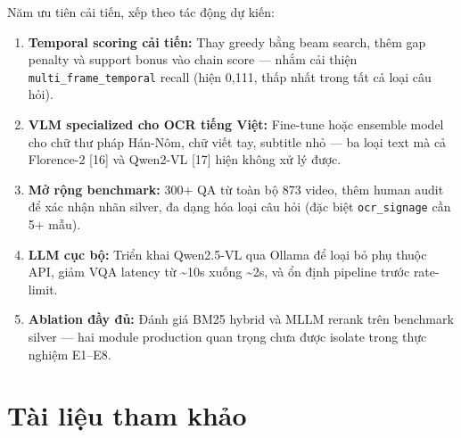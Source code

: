 \documentclass[12pt,a4paper,onecolumn]{article}
\begin{document}
Năm ưu tiên cải tiến, xếp theo tác động dự kiến:

\begin{enumerate}
  \item \textbf{Temporal scoring cải tiến:} Thay greedy bằng beam search, thêm gap penalty và support bonus vào chain score — nhắm cải thiện \texttt{multi\_frame\_temporal} recall (hiện 0,111, thấp nhất trong tất cả loại câu hỏi).
  \item \textbf{VLM specialized cho OCR tiếng Việt:} Fine-tune hoặc ensemble model cho chữ thư pháp Hán-Nôm, chữ viết tay, subtitle nhỏ — ba loại text mà cả Florence-2 [16] và Qwen2-VL [17] hiện không xử lý được.
  \item \textbf{Mở rộng benchmark:} 300+ QA từ toàn bộ 873 video, thêm human audit để xác nhận nhãn silver, đa dạng hóa loại câu hỏi (đặc biệt \texttt{ocr\_signage} cần 5+ mẫu).
  \item \textbf{LLM cục bộ:} Triển khai Qwen2.5-VL qua Ollama để loại bỏ phụ thuộc API, giảm VQA latency từ \textasciitilde{}10s xuống \textasciitilde{}2s, và ổn định pipeline trước rate-limit.
  \item \textbf{Ablation đầy đủ:} Đánh giá BM25 hybrid và MLLM rerank trên benchmark silver — hai module production quan trọng chưa được isolate trong thực nghiệm E1–E8.
\end{enumerate}


\section*{Tài liệu tham khảo}
\end{document}
